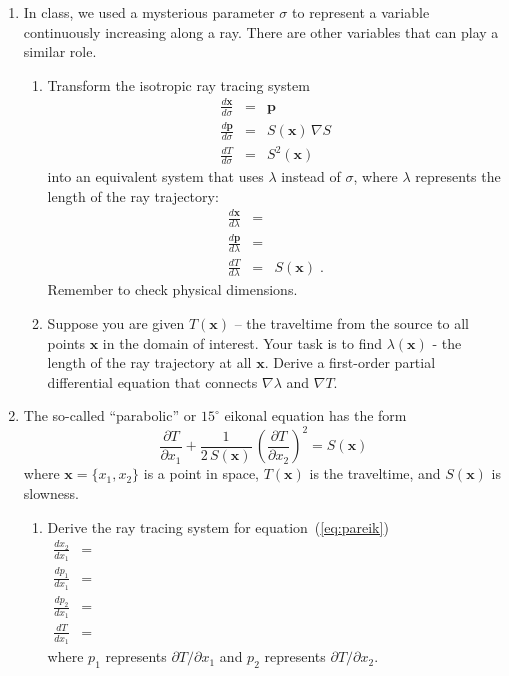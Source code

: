 \begin{enumerate}
\item In class, we used a mysterious parameter $\sigma$ to represent a
  variable continuously increasing along a ray. There are other
  variables that can play a similar role.
  \begin{enumerate}
\item Transform the isotropic ray tracing system
    \begin{eqnarray}
      \label{eq:xsigma}
      \frac{d \mathbf{x}}{d \sigma} & = & \mathbf{p} \\
      \label{eq:psigma}
      \frac{d \mathbf{p}}{d \sigma} & = & S(\mathbf{x})\,\nabla S \\
      \label{eq:tsigma}
      \frac{d T}{d \sigma} & = & S^2(\mathbf{x})
    \end{eqnarray}
    into an equivalent system that uses $\lambda$ instead of
    $\sigma$, where $\lambda$ represents the length of the ray trajectory:
    \begin{eqnarray} 
      \label{eq:xlambda}
      \frac{d \mathbf{x}}{d \lambda} & = & \\
      \label{eq:plambda}
      \frac{d \mathbf{p}}{d \lambda} & = & \\ 
      \label{eq:tlambda}
      \frac{d T}{d \lambda} & = & S(\mathbf{x})\;.
    \end{eqnarray}
    Remember to check physical dimensions.
 \item Suppose you are given $T(\mathbf{x})$ -- the traveltime from
  the source to all points $\mathbf{x}$ in the domain of
  interest. Your task is to find $\lambda(\mathbf{x})$ - the length of
  the ray trajectory at all $\mathbf{x}$. Derive a first-order partial
  differential equation that connects $\nabla \lambda$ and $\nabla T$.
  \end{enumerate}

\item The so-called ``parabolic'' or $15^{\circ}$ eikonal
  equation \cite[]{tappert,iei,bamberger} has the form
  \begin{equation}
    {\frac{\partial T}{\partial x_1}} + 
    {\frac{1}{2\,S(\mathbf{x})}\,\left(\frac{\partial T}{\partial x_2}\right)^2} =
    {S(\mathbf{x})}
    \label{eq:pareik}
  \end{equation}
  where $\mathbf{x}=\{x_1,x_2\}$ is a point in space, $T(\mathbf{x})$
  is the traveltime, and $S(\mathbf{x})$ is slowness. 
  \begin{enumerate}
  \item Derive the ray tracing system for equation~(\ref{eq:pareik})
    \begin{eqnarray}
      \label{eq:xt}
      \frac{d x_2}{d x_1} & = & \hspace{5in} \\
      \label{eq:pxt}
      \frac{d p_1}{d x_1} & = & \\
      \label{eq:pzt}
      \frac{d p_2}{d x_1} & = & \\
      \label{eq:tt}
      \frac{d T}{d x_1} & = &
    \end{eqnarray}
    where $p_1$ represents $\partial T/\partial x_1$ and 
    $p_2$ represents $\partial T/\partial x_2$.
   

\end{enumerate}
\end{enumerate}
